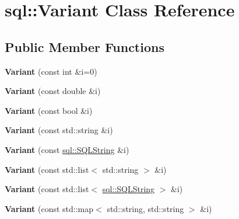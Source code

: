 \hypertarget{classsql_1_1_variant}{}\section{sql\+:\+:Variant Class Reference}
\label{classsql_1_1_variant}
\subsection*{Public Member Functions}
\begin{DoxyCompactItemize}
\item 
\hypertarget{classsql_1_1_variant_a3e45b2e2740ec0c4802494637e9206df}{}\label{classsql_1_1_variant_a3e45b2e2740ec0c4802494637e9206df} 
{\bfseries Variant} (const int \&i=0)
\item 
\hypertarget{classsql_1_1_variant_abc766ebf62d2430abf644089b4cd0176}{}\label{classsql_1_1_variant_abc766ebf62d2430abf644089b4cd0176} 
{\bfseries Variant} (const double \&i)
\item 
\hypertarget{classsql_1_1_variant_a6fb56c509635c8e1eb0ff78e538f0932}{}\label{classsql_1_1_variant_a6fb56c509635c8e1eb0ff78e538f0932} 
{\bfseries Variant} (const bool \&i)
\item 
\hypertarget{classsql_1_1_variant_a2c76e4cd5c0935728bd84d2c7c9dc34f}{}\label{classsql_1_1_variant_a2c76e4cd5c0935728bd84d2c7c9dc34f} 
{\bfseries Variant} (const std\+::string \&i)
\item 
\hypertarget{classsql_1_1_variant_af966a0c9980fcda78d14a3f2956aeea9}{}\label{classsql_1_1_variant_af966a0c9980fcda78d14a3f2956aeea9} 
{\bfseries Variant} (const \hyperlink{classsql_1_1_s_q_l_string}{sql\+::\+S\+Q\+L\+String} \&i)
\item 
\hypertarget{classsql_1_1_variant_aaa42466407cff394eaf165499c96a5ce}{}\label{classsql_1_1_variant_aaa42466407cff394eaf165499c96a5ce} 
{\bfseries Variant} (const std\+::list$<$ std\+::string $>$ \&i)
\item 
\hypertarget{classsql_1_1_variant_aff3232f730a6e14fb3425e8ff6631d92}{}\label{classsql_1_1_variant_aff3232f730a6e14fb3425e8ff6631d92} 
{\bfseries Variant} (const std\+::list$<$ \hyperlink{classsql_1_1_s_q_l_string}{sql\+::\+S\+Q\+L\+String} $>$ \&i)
\item 
\hypertarget{classsql_1_1_variant_acbfd8c447e90d791d8e7a26ac4147111}{}\label{classsql_1_1_variant_acbfd8c447e90d791d8e7a26ac4147111} 
{\bfseries Variant} (const std\+::map$<$ std\+::string, std\+::string $>$ \&i)
\item 
\hypertarget{classsql_1_1_variant_a2040d2456140a42a6f296286502d3a3d}{}\label{classsql_1_1_variant_a2040d2456140a42a6f296286502d3a3d} 

\end{DoxyCompactItemize}
